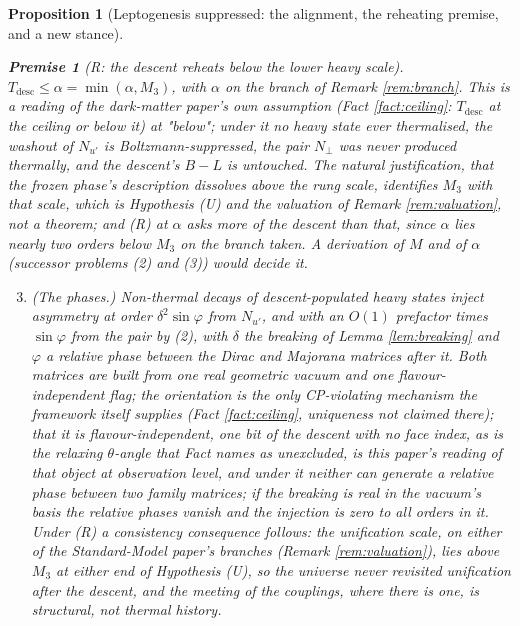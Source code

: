 \documentclass[11pt]{article}
\newtheorem{proposition}[theorem]{Proposition}
\theoremstyle{definition}
\newtheorem{premise}[theorem]{Premise}
\begin{document}
\begin{proposition}[Leptogenesis suppressed: the alignment, the reheating premise, and a new stance]
\begin{enumerate}
\end{enumerate}
\begin{premise}[R: the descent reheats below the lower heavy scale]\label{prem:R}
$T_{\mathrm{desc}} \le \alpha = \min(\alpha, M_{3})$, with $\alpha$ on the branch of Remark \ref{rem:branch}. This is a reading of the dark-matter paper's own assumption (Fact \ref{fact:ceiling}: $T_{\mathrm{desc}}$ at the ceiling or below it) at "below"; under it no heavy state ever thermalised, the washout of $N_{u'}$ is Boltzmann-suppressed, the pair $N_{\perp}$ was never produced thermally, and the descent's $B - L$ is untouched. The natural justification, that the frozen phase's description dissolves above the rung scale, identifies $M_{3}$ with that scale, which is Hypothesis (U) and the valuation of Remark \ref{rem:valuation}, not a theorem; and (R) at $\alpha$ asks more of the descent than that, since $\alpha$ lies nearly two orders below $M_{3}$ on the branch taken. A derivation of $M$ and of $\alpha$ (successor problems (2) and (3)) would decide it.
\end{premise}
\begin{enumerate}
\setcounter{enumi}{2}
\item \emph{(The phases.)} Non-thermal decays of descent-populated heavy states inject asymmetry at order $\delta^{2}\sin\varphi$ from $N_{u'}$, and with an $O(1)$ prefactor times $\sin\varphi$ from the pair by (2), with $\delta$ the breaking of Lemma \ref{lem:breaking} and $\varphi$ a relative phase between the Dirac and Majorana matrices after it. Both matrices are built from one real geometric vacuum and one flavour-independent flag; the orientation is the only CP-violating mechanism the framework itself supplies (Fact \ref{fact:ceiling}, uniqueness not claimed there); that it is flavour-independent, one bit of the descent with no face index, as is the relaxing $\theta$-angle that Fact names as unexcluded, is this paper's reading of that object at observation level, and under it neither can generate a \emph{relative} phase between two family matrices; if the breaking is real in the vacuum's basis the relative phases vanish and the injection is zero to all orders in it. Under (R) a consistency consequence follows: the unification scale, on either of the Standard-Model paper's branches (Remark \ref{rem:valuation}), lies above $M_{3}$ at either end of Hypothesis (U), so the universe never revisited unification after the descent, and the meeting of the couplings, where there is one, is structural, not thermal history.
\end{enumerate}

\end{proposition}
\end{document}
